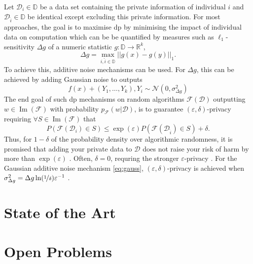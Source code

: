 \documentclass[12pt,fleqn,twocolumn]{article}
\newcommand{\RR}{\ensuremath{\mathbb R}}
\newcommand{\DD}{\ensuremath{\mathbb D}}
\newcommand{\reci}{\ensuremath{^{-1}}}
\begin{document}
Let $\mathcal D_i \in \DD$ be a data set containing the private information of individual $i$ and $\mathcal D_{\hat i} \in \DD$ be identical except excluding this private information.
For most approaches, the goal is to maximise \acrshort{dp} by minimising the impact of individual data on computation which can be be quantified by measures such as $\ell_1$-sensitivity \cite[pp.31]{dwork2014alg} $\Delta g$ of a numeric statistic $g: \DD \rightarrow \RR^k$,
\begin{equation}
    \Delta g= \operatorname{max}_{i, \hat i \in \DD} ||g(x)-g(y)||_1.
\end{equation}
To achieve this, additive noise mechanisms can be used.
For $\Delta g$, this can be achieved by adding Gaussian noise to outputs \cite[D 3.3]{dwork2014alg} 
\begin{equation}\label{eq:gauss}
  f(x)+(Y_1, \ldots, Y_k), Y_i \sim \mathcal N(0, \sigma_{\Delta g}^2)  
\end{equation}
The end goal of such \acrshort{dp} mechanisms on random algorithms $\mathcal F(\mathcal D)$ outputting $w \in \operatorname{Im}(\mathcal F)$ with probability $p_{\mathcal F}(w|\mathcal D)$, is to guarantee $(\varepsilon, \delta)$-privacy \cite[Def. 2.4]{dwork2014alg} requiring $\forall S \in \operatorname{Im}(\mathcal F)$ that
\begin{equation}
    P\left(
        \mathcal{F}(\mathcal D_i) \in S
    \right)
    \leq
    \exp(\varepsilon)
    P\left(
        \mathcal{F}(\mathcal D_{\hat i}) \in S
    \right)
    +\delta.
\end{equation}
Thus, for $1-\delta$ of the probability density over algorithmic randomness, it is promised that adding your private data to $\mathcal D$ does not raise your risk of harm by more than $\exp(\varepsilon)$ \cite[pp. 21]{dwork2014alg}.
Often, $\delta=0$, requring the stronger $\varepsilon$-privacy \cite{wiki2022diff}.
For the Gaussian additive noise mechanism \eqref{eq:gauss}, $(\varepsilon, \delta)$-privacy is achieved when $\sigma_{\Delta g}^2=\Delta g \ln(\nicefrac 1 \delta)\varepsilon\reci$ \cite[App. A]{dwork2014alg}.

\section*{State of the Art}%
\label{sec:State of The Art}

\section*{Open Problems}%
\label{sec:Open Problems}

\clearpage
\renewcommand*{\bibfont}{\normalfont\footnotesize}
\printbibliography[heading=bibintoc]

\printglossary[type=\acronymtype]
\end{document}
